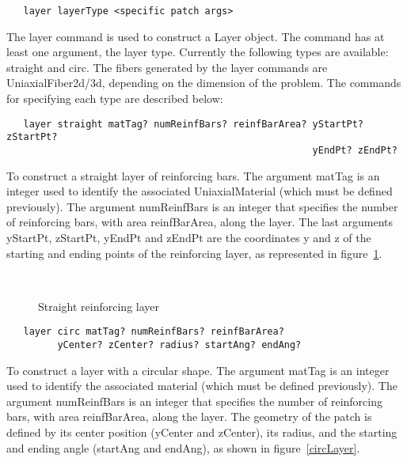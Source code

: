 \documentclass[12pt]{article}
\begin{document}
{\sf\small
\begin{verbatim}
   layer layerType <specific patch args>
\end{verbatim}
}

The layer command is used to construct a Layer object. 
The command has at least one argument, the layer type. Currently 
the following types are available: straight and circ. The fibers
generated by the layer commands are UniaxialFiber2d/3d, depending on
the dimension of the problem. The commands
for specifying each type are described below:

{\sf\small
\begin{verbatim}
   layer straight matTag? numReinfBars? reinfBarArea? yStartPt? zStartPt? 
                                                      yEndPt? zEndPt?
\end{verbatim}
}

\noindent To construct a straight layer of reinforcing bars. The
argument matTag is an integer used to identify the associated
UniaxialMaterial (which must be defined previously). The argument 
numReinfBars is an integer that specifies the number of reinforcing 
bars, with area reinfBarArea, along the layer. The last arguments 
yStartPt, zStartPt, yEndPt and zEndPt are the coordinates y and z of 
the starting and ending points of the
reinforcing layer, as represented in figure~\ref{straightLayer}.


\begin{figure}[htpb]
\begin{center}
\leavevmode
\hbox{%
}
\end{center}
\caption{Straight reinforcing layer}
\label{straightLayer}
\end{figure}




{\sf\small
\begin{verbatim}
   layer circ matTag? numReinfBars? reinfBarArea? 
         yCenter? zCenter? radius? startAng? endAng?
\end{verbatim}
}

\noindent To construct a layer with a circular shape. The
argument matTag is an integer used to identify the associated
material (which must be defined previously). The argument 
numReinfBars is an integer that specifies the number of reinforcing 
bars, with area reinfBarArea, along the layer. 
The geometry of the patch is defined by its center position
(yCenter and zCenter), its radius, and the starting and ending angle 
(startAng and endAng), as shown in figure~\ref{circLayer}. 
\end{document}
